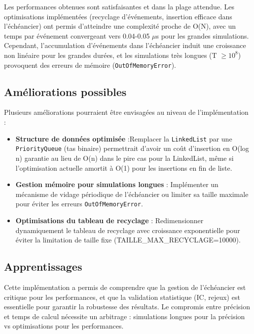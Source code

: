 \documentclass[12pt,a4paper]{article}
\begin{document}
Les performances obtenues sont satisfaisantes et dans la plage attendue. Les optimisations implémentées (recyclage d'événements, insertion efficace dans l'échéancier) ont permis d'atteindre une complexité proche de O(N), avec un temps par événement convergeant vers 0.04-0.05 $\mu$s pour les grandes simulations. Cependant, l'accumulation d'événements dans l'échéancier induit une croissance non linéaire pour les grandes durées, et les simulations très longues (T $\geq 10^8$) provoquent des erreurs de mémoire (\texttt{OutOfMemoryError}).

\subsection{Améliorations possibles}

Plusieurs améliorations pourraient être envisagées au niveau de l'implémentation :

\begin{itemize}
    \item \textbf{Structure de données optimisée} :\newline Remplacer la \texttt{LinkedList} par une \texttt{PriorityQueue} (tas binaire) permettrait d'avoir un coût d'insertion en O(log n) garantie au lieu de O(n) dans le pire cas pour la LinkedList, même si l'optimisation actuelle amortit à O(1) pour les insertions en fin de liste.
    
    \item \textbf{Gestion mémoire pour simulations longues} : Implémenter un mécanisme de vidage périodique de l'échéancier ou limiter sa taille maximale pour éviter les erreurs \texttt{OutOfMemoryError}.
    
    \item \textbf{Optimisations du tableau de recyclage} : Redimensionner dynamiquement le tableau de recyclage avec croissance exponentielle pour éviter la limitation de taille fixe (TAILLE\_MAX\_RECYCLAGE=10000).

\end{itemize}

\subsection{Apprentissages}

Cette implémentation a permis de comprendre que la gestion de l'échéancier est critique pour les performances, et que la validation statistique (IC, rejeux) est essentielle pour garantir la robustesse des résultats. Le compromis entre précision et temps de calcul nécessite un arbitrage : simulations longues pour la précision vs optimisations pour les performances.
\end{document}
